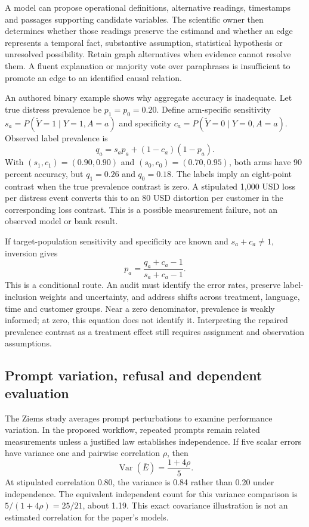 A model can propose operational definitions, alternative readings, timestamps and passages supporting candidate variables. The scientific owner then determines whether those readings preserve the estimand and whether an edge represents a temporal fact, substantive assumption, statistical hypothesis or unresolved possibility. Retain graph alternatives when evidence cannot resolve them. A fluent explanation or majority vote over paraphrases is insufficient to promote an edge to an identified causal relation.~\citep{exec24_css_knowledge_reference}

An authored binary example shows why aggregate accuracy is inadequate. Let true distress prevalence be $p_1=p_0=0.20$. Define arm-specific sensitivity $s_a=P(\widetilde Y=1\mid Y=1,A=a)$ and specificity $c_a=P(\widetilde Y=0\mid Y=0,A=a)$. Observed label prevalence is
\[
 q_a=s_a p_a+(1-c_a)(1-p_a).
\]
With $(s_1,c_1)=(0.90,0.90)$ and $(s_0,c_0)=(0.70,0.95)$, both arms have 90 percent accuracy, but $q_1=0.26$ and $q_0=0.18$. The labels imply an eight-point contrast when the true prevalence contrast is zero. A stipulated 1,000 USD loss per distress event converts this to an 80 USD distortion per customer in the corresponding loss contrast. This is a possible measurement failure, not an observed model or bank result.~\citep{exec24_css_knowledge_reference}

If target-population sensitivity and specificity are known and $s_a+c_a\ne1$, inversion gives
\[
 p_a=\frac{q_a+c_a-1}{s_a+c_a-1}.
\]
This is a conditional route. An audit must identify the error rates, preserve label-inclusion weights and uncertainty, and address shifts across treatment, language, time and customer groups. Near a zero denominator, prevalence is weakly informed; at zero, this equation does not identify it. Interpreting the repaired prevalence contrast as a treatment effect still requires assignment and observation assumptions.~\citep{exec24_css_knowledge_reference}

\subsection{Prompt variation, refusal and dependent evaluation}
The Ziems study averages prompt perturbations to examine performance variation. In the proposed workflow, repeated prompts remain related measurements unless a justified law establishes independence. If five scalar errors have variance one and pairwise correlation $\rho$, then
\[
 \operatorname{Var}(\overline E)=\frac{1+4\rho}{5}.
\]
At stipulated correlation 0.80, the variance is 0.84 rather than 0.20 under independence. The equivalent independent count for this variance comparison is $5/(1+4\rho)=25/21$, about 1.19. This exact covariance illustration is not an estimated correlation for the paper's models.~\citep{exec24_css_original,exec24_css_knowledge_reference}

